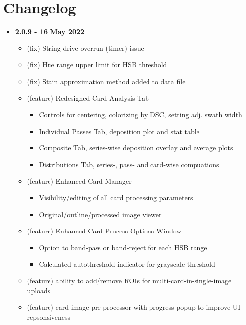 \documentclass[10pt,letterpaper,titlepage]{article}
\begin{document}
    \newpage

    \section{Changelog}
    \begin{itemize}
        \item \textbf{2.0.9 - 16 May 2022}
        \begin{itemize}
            \item (fix) String drive overrun (timer) issue
            \item (fix) Hue range upper limit for HSB threshold
            \item (fix) Stain approximation method added to data file
            \item (feature) Redesigned Card Analysis Tab
            \begin{itemize}
                \item Controls for centering, colorizing by DSC, setting adj. swath width
                \item Individual Passes Tab, deposition plot and stat table
                \item Composite Tab, series-wise deposition overlay and average plots
                \item Distributions Tab, series-, pass- and card-wise compuations
            \end{itemize}
            \item (feature) Enhanced Card Manager
            \begin{itemize}
                \item Visibility/editing of all card processing parameters
                \item Original/outline/processed image viewer
            \end{itemize}
            \item (feature) Enhanced Card Process Options Window
            \begin{itemize}
                \item Option to band-pass or band-reject for each HSB range
                \item Calculated autothreshold indicator for grayscale threshold
            \end{itemize}
            \item (feature) ability to add/remove ROIs for multi-card-in-single-image uploads
            \item (feature) card image pre-processor with progress popup to improve UI repsonsiveness

\end{itemize}
\end{itemize}
\end{document}

